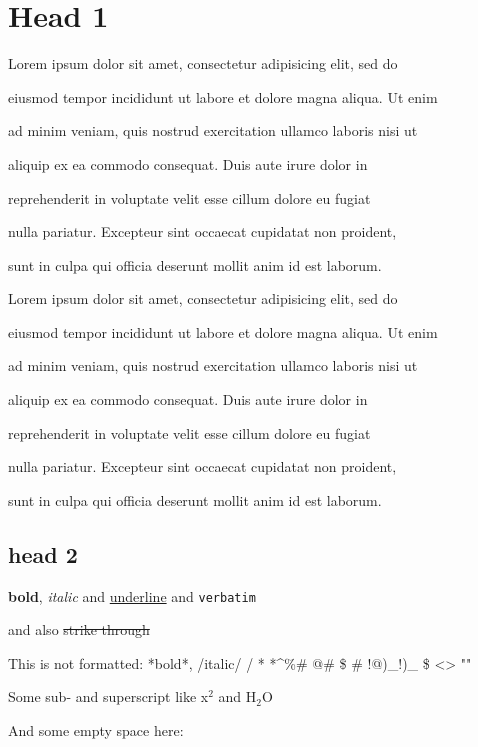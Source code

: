 \chapter{Head 1}
Lorem ipsum dolor sit amet, consectetur adipisicing elit, sed do

eiusmod tempor incididunt ut labore et dolore magna aliqua. Ut enim

ad minim veniam, quis nostrud exercitation ullamco laboris nisi ut

aliquip ex ea commodo consequat. Duis aute irure dolor in

reprehenderit in voluptate velit esse cillum dolore eu fugiat

nulla pariatur.  Excepteur sint occaecat cupidatat non proident,

sunt in culpa qui officia deserunt mollit anim id est laborum.



	Lorem ipsum dolor sit amet, consectetur adipisicing elit, sed do
	
	eiusmod tempor incididunt ut labore et dolore magna aliqua. Ut enim
	
	ad minim veniam, quis nostrud exercitation ullamco laboris nisi ut
	
	aliquip ex ea commodo consequat. Duis aute irure dolor in
	
	reprehenderit in voluptate velit esse cillum dolore eu fugiat
	
	nulla pariatur.  Excepteur sint occaecat cupidatat non proident,
	
	sunt in culpa qui officia deserunt mollit anim id est laborum.
	


\section{head 2}


\textbf{bold}, \emph{italic} and \uline{underline} and \lstinline+verbatim+

and also \sout{strike through}



This is not formatted: *bold*, /italic/ / * *\^{}\%\# @\# \$ \# !@)\_!)\_ \$ \textless{}\textgreater{} ""



Some sub- and superscript like x$^{2}$ and H$_{2}$O



And some empty space here:







